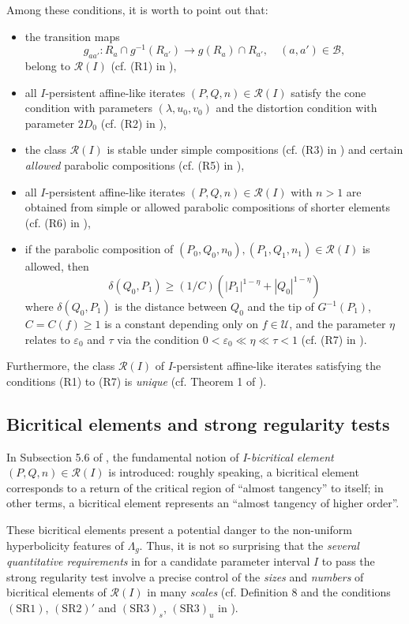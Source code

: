 \documentclass[12pt]{amsart}
\numberwithin{equation}{section}
\theoremstyle{definition}
\newcommand{\<}{{\langle}}
\renewcommand{\>}{{\rangle}}
\begin{document}
Among these conditions, it is worth to point out that: 
\begin{itemize}
\item the transition maps 
$$g_{aa'}:R_a\cap g^{-1}(R_{a'})\to g(R_a)\cap R_{a'}, \quad (a,a')\in\mathcal{B},$$
belong to $\mathcal{R}(I)$ (cf. (R1) in \cite{PY09}), 
\item all $I$-persistent affine-like iterates $(P,Q,n)\in\mathcal{R}(I)$ satisfy the cone condition with parameters $(\lambda, u_0, v_0)$ and the distortion condition with parameter $2D_0$ (cf. (R2) in \cite{PY09}), 
\item the class $\mathcal{R}(I)$ is stable under simple compositions (cf. (R3) in \cite{PY09}) and certain \emph{allowed} parabolic compositions (cf. (R5) in \cite{PY09}), 
\item all $I$-persistent affine-like iterates $(P,Q,n)\in\mathcal{R}(I)$ with $n>1$ are obtained from simple or allowed parabolic compositions of shorter elements (cf. (R6) in \cite{PY09}),
\item if the parabolic composition of $(P_0, Q_0, n_0), (P_1, Q_1, n_1)\in\mathcal{R}(I)$ is allowed, then 
$$\delta(Q_0, P_1)\geq (1/C)(|P_1|^{1-\eta}+|Q_0|^{1-\eta})$$
where $\delta(Q_0, P_1)$ is the distance between $Q_0$ and the tip of $G^{-1}(P_1)$, $C=C(f)\geq 1$ is a constant depending only on $f\in\mathcal{U}$, and the parameter $\eta$ relates to $\varepsilon_0$ and $\tau$ via the condition $0<\varepsilon_0\ll\eta\ll\tau<1$ (cf. (R7) in \cite{PY09}).
\end{itemize} 
Furthermore, the class $\mathcal{R}(I)$ of $I$-persistent affine-like iterates satisfying the conditions (R1) to (R7) is \emph{unique} (cf. Theorem 1 of \cite{PY09}).

\subsection{Bicritical elements and strong regularity tests} In Subsection 5.6 of \cite{PY09}, the fundamental notion of $I$-\emph{bicritical element} $(P,Q,n)\in\mathcal{R}(I)$ is introduced: roughly speaking, a bicritical element corresponds to a return of the critical region of ``almost tangency'' to itself; in other terms, a bicritical element represents an ``almost tangency of higher order''. 

These bicritical elements present a potential danger to the non-uniform hyperbolicity features of $\Lambda_g$. Thus, it is not so surprising that the \emph{several quantitative requirements} in \cite{PY09} for a candidate parameter interval $I$ to pass the strong regularity test involve a precise control of the \emph{sizes} and \emph{numbers} of bicritical elements of $\mathcal{R}(I)$ in many \emph{scales} (cf. Definition 8 and the conditions $(\textrm{SR}1)$, $(\textrm{SR}2)'$ and $(\textrm{SR}3)_s$, $(\textrm{SR}3)_u$ in \cite{PY09}).
\end{document}
